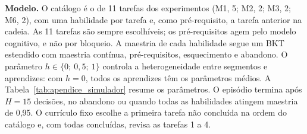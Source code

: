 \noindent\textbf{Modelo.} O catálogo é o de 11 tarefas dos experimentos (M1, 5; M2, 2; M3, 2; M6, 2), com uma habilidade por tarefa e, como pré-requisito, a tarefa anterior na cadeia. As 11 tarefas são sempre escolhíveis; os pré-requisitos agem pelo modelo cognitivo, e não por bloqueio. A maestria de cada habilidade segue um BKT estendido com maestria contínua, pré-requisitos, esquecimento e abandono. O parâmetro $h \in \{0;\ 0{,}5;\ 1\}$ controla a heterogeneidade entre segmentos e aprendizes: com $h = 0$, todos os aprendizes têm os parâmetros médios. A Tabela~\ref{tab:apendice_simulador} resume os parâmetros. O episódio termina após $H = 15$ decisões, no abandono ou quando todas as habilidades atingem maestria de 0,95. O currículo fixo escolhe a primeira tarefa não concluída na ordem do catálogo e, com todas concluídas, revisa as tarefas 1 a 4.

